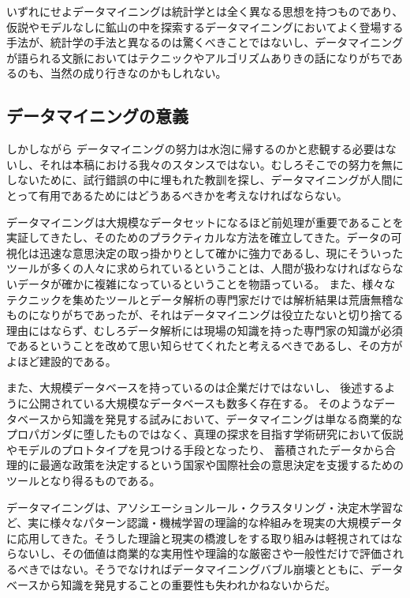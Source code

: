 いずれにせよデータマイニングは統計学とは全く異なる思想を持つものであり、仮説やモデルなしに鉱山の中を探索するデータマイニングにおいてよく登場する手法が、統計学の手法と異なるのは驚くべきことではないし、データマイニングが語られる文脈においてはテクニックやアルゴリズムありきの話になりがちであるのも、当然の成り行きなのかもしれない。

\subsection{データマイニングの意義}
しかしながら
データマイニングの努力は水泡に帰するのかと悲観する必要はないし、それは本稿における我々のスタンスではない。むしろそこでの努力を無にしないために、試行錯誤の中に埋もれた教訓を探し、データマイニングが人間にとって有用であるためにはどうあるべきかを考えなければならない。

データマイニングは大規模なデータセットになるほど前処理が重要であることを実証してきたし、そのためのプラクティカルな方法を確立してきた。データの可視化は迅速な意思決定の取っ掛かりとして確かに強力であるし、現にそういったツールが多くの人々に求められているということは、人間が扱わなければならないデータが確かに複雑になっているということを物語っている。
また、様々なテクニックを集めたツールとデータ解析の専門家だけでは解析結果は荒唐無稽なものになりがちであったが、それはデータマイニングは役立たないと切り捨てる理由にはならず、むしろデータ解析には現場の知識を持った専門家の知識が必須であるということを改めて思い知らせてくれたと考えるべきであるし、その方がよほど建設的である。

また、大規模データベースを持っているのは企業だけではないし、
後述するように公開されている大規模なデータベースも数多く存在する。
そのようなデータベースから知識を発見する試みにおいて、データマイニングは単なる商業的なプロパガンダに堕したものではなく、真理の探求を目指す学術研究において仮説やモデルのプロトタイプを見つける手段となったり、
蓄積されたデータから合理的に最適な政策を決定するという国家や国際社会の意思決定を支援するためのツールとなり得るものである。

データマイニングは、アソシエーションルール・クラスタリング・決定木学習など、実に様々なパターン認識・機械学習の理論的な枠組みを現実の大規模データに応用してきた。そうした理論と現実の橋渡しをする取り組みは軽視されてはならないし、その価値は商業的な実用性や理論的な厳密さや一般性だけで評価されるべきではない。そうでなければデータマイニングバブル崩壊とともに、データベースから知識を発見することの重要性も失われかねないからだ。

